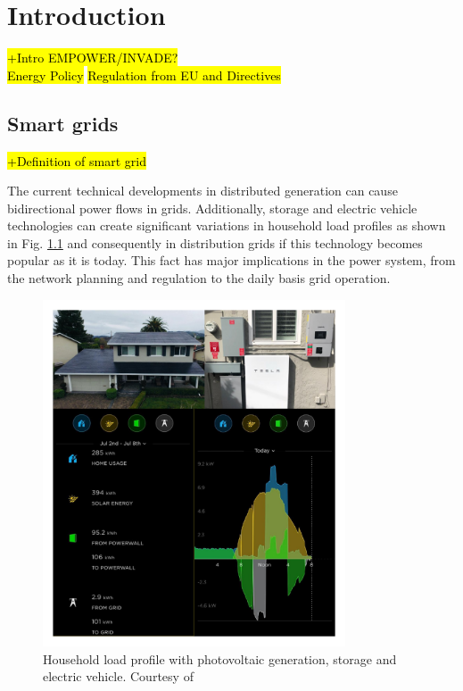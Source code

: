 \chapter{Introduction}
\label{chapterIntro}
\hl{+Intro EMPOWER/INVADE?} \\
\hl{Energy Policy}
\hl{Regulation from EU and Directives} \\


\section{Smart grids}
\hl{+Definition of smart grid}

The current technical developments in distributed generation can cause bidirectional power flows in grids. Additionally, storage and electric vehicle technologies can create significant variations in household load profiles as shown in Fig. \ref{fig:IntroTesla} and consequently in distribution grids if this technology becomes popular as it is today. This fact has major implications in the power system, from the network planning and regulation to the daily basis grid operation. 

\begin{figure}
	\centering
	\includegraphics[width=0.8\textwidth]{ChapterIntro/figures/EV_load_profile_Tesla_user.pdf}
	\caption{Household load profile with photovoltaic generation, storage and electric vehicle. Courtesy of \cite{TwitterToblerhaus}}
	\label{fig:IntroTesla}
	\end{figure}

